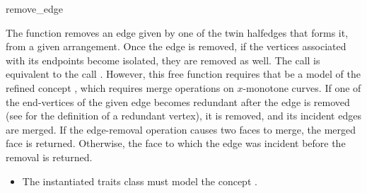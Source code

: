 \ccRefPageBegin

\begin{ccRefFunction}{remove_edge}

\ccDefinition

The function \ccRefName{} removes an edge given by one of the twin halfedges
that forms it, from a given arrangement. Once the edge is removed, if the
vertices associated with its endpoints become isolated, they are removed as
well. The call  is equivalent to the call
. However, this free function requires
that  be a model of the refined concept
, which requires merge operations
on $x$-monotone curves. If one of the end-vertices of the given edge
becomes redundant after the edge is removed (see 
for the definition of a redundant vertex), it is removed, and its
incident edges are merged.
If the edge-removal operation causes two faces to merge, the merged face
is returned. Otherwise, the face to which the edge was incident before the
removal is returned.



\ccRequirements
\begin{itemize}
\item The instantiated traits class must model the concept
  . 
\end{itemize}

\end{ccRefFunction}

\ccRefPageEnd
